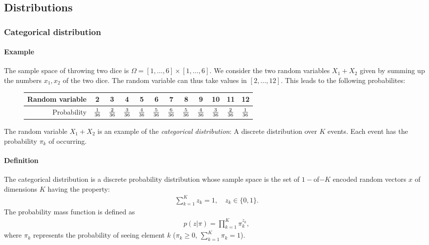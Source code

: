 \subsection{Distributions}
\subsubsection{Categorical distribution}

\paragraph{Example}
The sample space of throwing two dice is $\Omega = [1,\ldots,6]\times [1,\ldots, 6]$. We consider the two random variables $X_1+X_2$ given by summing up the numbers $x_1, x_2$ of the two dice. The random variable can thus take values in $[2,\ldots, 12]$. This leads to the following probabilites:
\begin{figure}[H]
    \centering
    \begin{tabular}{r|ccccc ccccc c}
        Random variable &2&3&4&5&6&7&8&9&10&11&12\\\hline
        Probability & ${1\over 36}$& ${2\over 36}$& ${3\over 36}$&  ${4\over 36}$& ${5\over 36}$&  ${6\over 36}$& ${5\over 36}$& ${4\over 36}$& ${3\over 36}$& ${2\over 36}$&  ${1\over 36}$
    \end{tabular}
\end{figure}
The random variable $X_1+X_2$ is an example of the \emph{categorical distribution}: A discrete distribution over $K$ events. Each event has the probability $\pi_k$ of occurring.

\paragraph{Definition}
The categorical distribution is a discrete probability distribution whose sample space is the set of $1-$of$-K$ encoded random vectors $x$ of dimensions $K$ having the property:
\begin{align*}
    \sum_{k=1}^K z_k =1, \quad z_k \in \{0,1\}.
\end{align*}
The probability mass function is defined as
\begin{align*}
    p(z| \pi) = \prod_{k=1}^K \pi_k^{z_k},
\end{align*}
where $\pi_k$ represents the probability of seeing element $k$ ($\pi_k \geq 0$, $\sum_{k=1}^K \pi_k =1$).


